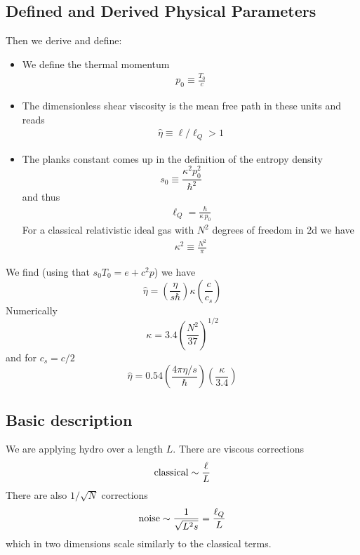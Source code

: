 \documentclass[12pt,aps,preprint,nofootinbib,noshowkeys,noshowpacs,longbibliography,superscriptaddress,tightenlines]{revtex4-2}
\begin{document}
\subsection{Defined and Derived Physical Parameters}
Then we derive and define:
\begin{itemize}
\item We define the thermal momentum
\begin{align}
  p_0 \equiv  \frac{T_0}{c}
\end{align}

\item The dimensionless shear viscosity
is the mean free path in these units and reads
\begin{align}
   \hat \eta \equiv \ell /\ell_Q   > 1
\end{align} 

  
\item  The planks constant comes up in the definition of the entropy
density 
\begin{equation}
s_0  \equiv   \frac{ \kappa^2 p_0^2 }{\hbar^2}  \qquad    
\end{equation}
and thus
\begin{align}
  \ell_Q =   \frac{\hbar}{\kappa\, p_0}
\end{align}
For a classical relativistic ideal gas with  $N^2$ degrees of freedom
 in 2d we have
\begin{align}
    \kappa^2 \equiv \frac{N^2}{\pi} 
\end{align}
\end{itemize}

We find (using that $s_0 T_0 = e + c^2 p$) we have
\begin{equation}
 \hat \eta = \left(\frac{\eta}{s \hbar } \right)   \kappa \left(\frac{c}{c_s} \right)
\end{equation}
Numerically 
\begin{equation}
 \kappa =  3.4    \left( \frac{N^2}{37}  \right)^{1/2}
\end{equation}
and  for $c_s = c/2$
\begin{equation}
 \hat \eta = 0.54 \left( \frac{4\pi \eta/s}{\hbar }\right)   \left( \frac{\kappa }{3.4}  \right) 
\end{equation}

\subsection{Basic description}

We are applying hydro over a length $L$. There are viscous corrections 
\begin{align}
      {\rm classical} \sim \frac{\ell}{L}
\end{align}
There are also $1/\sqrt{N}$ corrections 
\begin{align}
    {\rm noise} \sim \frac{1}{\sqrt{L^2 s} } =  \frac{\ell_Q}{L}
\end{align}
which in two dimensions scale similarly to the classical terms. 
\end{document}

